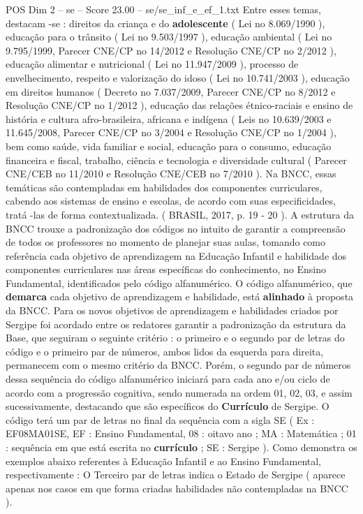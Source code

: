 \begin{textsample}{POS Dim 2 – se – Score 23.00 – se/se\_inf\_e\_ef\_1.txt}
Entre esses temas, destacam -se : direitos da criança e do \textbf{adolescente} ( Lei no 8.069/1990 ), educação para o trânsito ( Lei no 9.503/1997 ), educação ambiental ( Lei no 9.795/1999, Parecer CNE/CP no 14/2012 e Resolução CNE/CP no 2/2012 ), educação alimentar e nutricional ( Lei no 11.947/2009 ), processo de envelhecimento, respeito e valorização do idoso ( Lei no 10.741/2003 ), educação em direitos humanos ( Decreto no 7.037/2009, Parecer CNE/CP no 8/2012 e Resolução CNE/CP no 1/2012 ), educação das relações étnico-raciais e ensino de história e cultura afro-brasileira, africana e indígena ( Leis no 10.639/2003 e 11.645/2008, Parecer CNE/CP no 3/2004 e Resolução CNE/CP no 1/2004 ), bem como saúde, vida familiar e social, educação para o consumo, educação financeira e fiscal, trabalho, ciência e tecnologia e diversidade cultural ( Parecer CNE/CEB no 11/2010 e Resolução CNE/CEB no 7/2010 ).
Na BNCC, essas temáticas são contempladas em habilidades dos componentes curriculares, cabendo aos sistemas de ensino e escolas, de acordo com suas especificidades, tratá -las de forma contextualizada. ( BRASIL, 2017, p. 19 - 20 ).
A estrutura da BNCC trouxe a padronização dos códigos no intuito de garantir a compreensão de todos os professores no momento de planejar suas aulas, tomando como referência cada objetivo de aprendizagem na Educação Infantil e habilidade dos componentes curriculares nas áreas específicas do conhecimento, no Ensino Fundamental, identificados pelo código alfanumérico.
O código alfanumérico, que \textbf{demarca} cada objetivo de aprendizagem e habilidade, está \textbf{alinhado} à proposta da BNCC.
Para os novos objetivos de aprendizagem e habilidades criados por Sergipe foi acordado entre os redatores garantir a padronização da estrutura da Base, que seguiram o seguinte critério : o primeiro e o segundo par de letras do código e o primeiro par de números, ambos lidos da esquerda para direita, permanecem com o mesmo critério da BNCC.
Porém, o segundo par de números dessa sequência do código alfanumérico iniciará para cada ano e/ou ciclo de acordo com a progressão cognitiva, sendo numerada na ordem 01, 02, 03, e assim sucessivamente, destacando que são específicos do \textbf{Currículo} de Sergipe.
O código terá um par de letras no final da sequência com a sigla SE ( Ex : EF08MA01SE, EF : Ensino Fundamental, 08 : oitavo ano ; MA : Matemática ; 01 : sequência em que está escrita no \textbf{currículo} ; SE : Sergipe ).
Como demonstra os exemplos abaixo referentes à Educação Infantil e ao Ensino Fundamental, respectivamente : O Terceiro par de letras indica o Estado de Sergipe ( aparece apenas nos casos em que forma criadas habilidades não contempladas na BNCC ).

\end{textsample}
